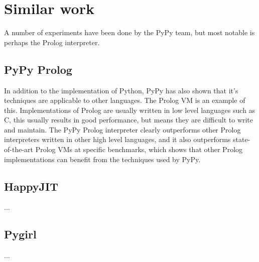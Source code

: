 \section{Similar work}

A number of experiments have been done by the PyPy team, but most notable is perhaps
the Prolog interpreter. 

\subsection{PyPy Prolog}

In addition to the implementation of Python, PyPy has also shown that it's techniques
are applicable to other languages. The Prolog VM is an example of this. Implementations
of Prolog are usually written in low level languages such as C, this usually results in
good performance, but means they are difficult to write and maintain. The PyPy Prolog 
interpreter clearly outperforms other Prolog interpreters written in other high level
languages, and it also outperforms state-of-the-art Prolog VMs at specific benchmarks,
which shows that other Prolog implementations can benefit from the techniques used by
PyPy. \cite{bolz2010towards}


\subsection{HappyJIT}

...

\subsection{Pygirl}

...



